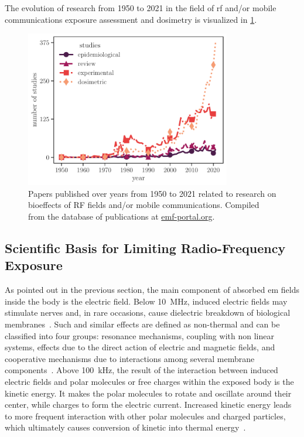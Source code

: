The evolution of research from 1950 to 2021 in the field of \gls{rf} and/or mobile communications exposure assessment and dosimetry is visualized in \cref{fig:research_compilation}.
\begin{figure}[ht]
    \centering
    \includegraphics[width=0.8\textwidth]{artwork/research_compilation.pdf}
    \caption{Papers published over years from 1950 to 2021 related to research on bioeffects of RF fields and/or mobile communications. Compiled from the database of publications at \url{emf-portal.org}.}
    \label{fig:research_compilation}
\end{figure}

\subsection{Scientific Basis for Limiting Radio-Frequency Exposure}
As pointed out in the previous section, the main component of absorbed \gls{em} fields inside the body is the electric field.
Below \SI{10}{\MHz}, induced electric fields may stimulate nerves and, in rare occasions, cause dielectric breakdown of biological membranes~\cite{Swicord2008Has}.
Such and similar effects are defined as non-thermal and can be classified into four groups: resonance mechanisms, coupling with non linear systems, effects due to the direct action of electric and magnetic fields, and cooperative mechanisms due to interactions among several membrane components~\cite{DInzeo200dDeliverable}.
Above \SI{100}{\kHz}, the result of the interaction between induced electric fields and polar molecules or free charges within the exposed body is the kinetic energy.
It makes the polar molecules to rotate and oscillate around their center, while charges to form the electric current.
Increased kinetic energy leads to more frequent interaction with other polar molecules and charged particles, which ultimately causes conversion of kinetic into thermal energy~\cite{Foster2018Modeling}.

